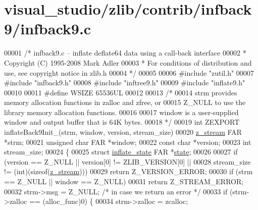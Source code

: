 \hypertarget{visual__studio_2zlib_2contrib_2infback9_2infback9_8c_source}{}\section{visual\+\_\+studio/zlib/contrib/infback9/infback9.c}
\label{visual__studio_2zlib_2contrib_2infback9_2infback9_8c_source}

\begin{DoxyCode}
00001 \textcolor{comment}{/* infback9.c -- inflate deflate64 data using a call-back interface}
00002 \textcolor{comment}{ * Copyright (C) 1995-2008 Mark Adler}
00003 \textcolor{comment}{ * For conditions of distribution and use, see copyright notice in zlib.h}
00004 \textcolor{comment}{ */}
00005 
00006 \textcolor{preprocessor}{#include "zutil.h"}
00007 \textcolor{preprocessor}{#include "infback9.h"}
00008 \textcolor{preprocessor}{#include "inftree9.h"}
00009 \textcolor{preprocessor}{#include "inflate9.h"}
00010 
00011 \textcolor{preprocessor}{#define WSIZE 65536UL}
00012 
00013 \textcolor{comment}{/*}
00014 \textcolor{comment}{   strm provides memory allocation functions in zalloc and zfree, or}
00015 \textcolor{comment}{   Z\_NULL to use the library memory allocation functions.}
00016 \textcolor{comment}{}
00017 \textcolor{comment}{   window is a user-supplied window and output buffer that is 64K bytes.}
00018 \textcolor{comment}{ */}
00019 \textcolor{keywordtype}{int} ZEXPORT inflateBack9Init\_(strm, window, version, stream\_size)
00020 \hyperlink{structz__stream__s}{z\_stream} FAR *strm;
00021 \textcolor{keywordtype}{unsigned} \textcolor{keywordtype}{char} FAR *window;
00022 \textcolor{keyword}{const} \textcolor{keywordtype}{char} *version;
00023 \textcolor{keywordtype}{int} stream\_size;
00024 \{
00025     \textcolor{keyword}{struct }\hyperlink{structinflate__state}{inflate\_state} FAR *\hyperlink{structstate}{state};
00026 
00027     \textcolor{keywordflow}{if} (version == Z\_NULL || version[0] != ZLIB\_VERSION[0] ||
00028         stream\_size != (\textcolor{keywordtype}{int})(\textcolor{keyword}{sizeof}(\hyperlink{structz__stream__s}{z\_stream})))
00029         \textcolor{keywordflow}{return} Z\_VERSION\_ERROR;
00030     \textcolor{keywordflow}{if} (strm == Z\_NULL || window == Z\_NULL)
00031         \textcolor{keywordflow}{return} Z\_STREAM\_ERROR;
00032     strm->msg = Z\_NULL;                 \textcolor{comment}{/* in case we return an error */}
00033     \textcolor{keywordflow}{if} (strm->zalloc == (alloc\_func)0) \{
00034         strm->zalloc = zcalloc;

\end{DoxyCode}

